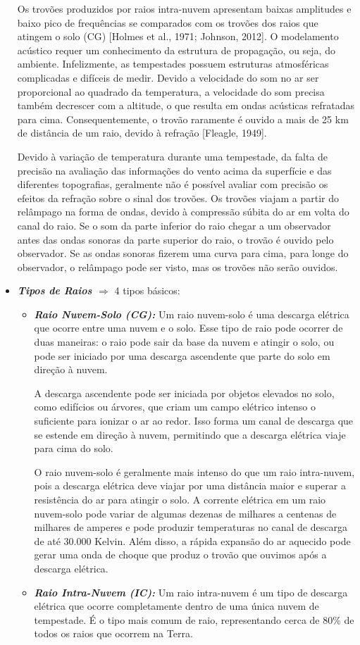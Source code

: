 \documentclass[a4paper, 12pt, onecolumn,singlespacing]{article}
\begin{document}
\begin{itemize}
		Os trovões produzidos por raios intra-nuvem apresentam baixas amplitudes e baixo pico de frequências se comparados com os trovões dos raios que atingem o solo (CG) [Holmes et al., 1971; Johnson, 2012]. O modelamento acústico requer um conhecimento da estrutura de propagação, ou seja, do ambiente. Infelizmente, as tempestades possuem estruturas atmosféricas complicadas e difíceis de medir. Devido a velocidade do som no ar ser proporcional ao quadrado da temperatura, a velocidade do som precisa também decrescer com a altitude, o que resulta em ondas acústicas refratadas para cima. Consequentemente, o trovão raramente é ouvido a mais de 25 km de distância de um raio, devido à refração [Fleagle, 1949].
		
		Devido à variação de temperatura durante uma tempestade, da falta de precisão na avaliação das informações do vento acima da superfície e das diferentes topografias, geralmente não é possível avaliar com precisão os efeitos da refração sobre o sinal dos trovões. Os trovões viajam a partir do relâmpago na forma de ondas, devido à compressão súbita do ar em volta do canal do raio. Se o som da parte inferior do raio chegar a um observador antes das ondas sonoras da parte superior do raio, o trovão é ouvido pelo observador. Se as ondas sonoras fizerem uma curva para cima, para longe do observador, o relâmpago pode ser visto, mas os trovões não serão ouvidos.
		\item \textbf{\textit{Tipos de Raios $\Rightarrow$ }} 4 tipos básicos:
		\begin{itemize}
			\item \textbf{\textit{Raio Nuvem-Solo (CG): }}Um raio nuvem-solo é uma descarga elétrica que ocorre entre uma nuvem e o solo. Esse tipo de raio pode ocorrer de duas maneiras: o raio pode sair da base da nuvem e atingir o solo, ou pode ser iniciado por uma descarga ascendente que parte do solo em direção à nuvem.
			
			A descarga ascendente pode ser iniciada por objetos elevados no solo, como edifícios ou árvores, que criam um campo elétrico intenso o suficiente para ionizar o ar ao redor. Isso forma um canal de descarga que se estende em direção à nuvem, permitindo que a descarga elétrica viaje para cima do solo.
			
			O raio nuvem-solo é geralmente mais intenso do que um raio intra-nuvem, pois a descarga elétrica deve viajar por uma distância maior e superar a resistência do ar para atingir o solo. A corrente elétrica em um raio nuvem-solo pode variar de algumas dezenas de milhares a centenas de milhares de amperes e pode produzir temperaturas no canal de descarga de até 30.000 Kelvin. Além disso, a rápida expansão do ar aquecido pode gerar uma onda de choque que produz o trovão que ouvimos após a descarga elétrica.
			\item \textbf{\textit{Raio Intra-Nuvem (IC): }}Um raio intra-nuvem é um tipo de descarga elétrica que ocorre completamente dentro de uma única nuvem de tempestade. É o tipo mais comum de raio, representando cerca de 80\% de todos os raios que ocorrem na Terra.
			

\end{itemize}
\end{itemize}
\end{document}
